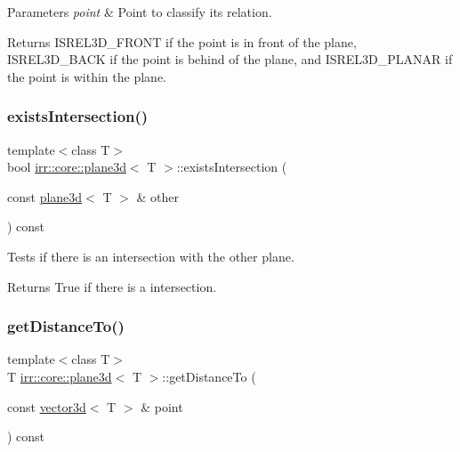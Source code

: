 \begin{DoxyParams}{Parameters}
{\em point} & Point to classify its relation. \\
\hline
\end{DoxyParams}
\begin{DoxyReturn}{Returns}
I\+S\+R\+E\+L3\+D\+\_\+\+F\+R\+O\+NT if the point is in front of the plane, I\+S\+R\+E\+L3\+D\+\_\+\+B\+A\+CK if the point is behind of the plane, and I\+S\+R\+E\+L3\+D\+\_\+\+P\+L\+A\+N\+AR if the point is within the plane. 
\end{DoxyReturn}
\mbox{\label{classirr_1_1core_1_1plane3d_a62f0838578d34260a5ef664718be59b4}} 
\subsubsection{\texorpdfstring{exists\+Intersection()}{existsIntersection()}}
{\footnotesize\ttfamily template$<$class T$>$ \\
bool \hyperlink{classirr_1_1core_1_1plane3d}{irr\+::core\+::plane3d}$<$ T $>$\+::exists\+Intersection (\begin{DoxyParamCaption}\item[{const \hyperlink{classirr_1_1core_1_1plane3d}{plane3d}$<$ T $>$ \&}]{other }\end{DoxyParamCaption}) const\hspace{0.3cm}{\ttfamily [inline]}}



Tests if there is an intersection with the other plane. 

\begin{DoxyReturn}{Returns}
True if there is a intersection. 
\end{DoxyReturn}
\mbox{\label{classirr_1_1core_1_1plane3d_ab5e41d5843bf3bb856f543186b8a7df8}} 
\subsubsection{\texorpdfstring{get\+Distance\+To()}{getDistanceTo()}}
{\footnotesize\ttfamily template$<$class T$>$ \\
T \hyperlink{classirr_1_1core_1_1plane3d}{irr\+::core\+::plane3d}$<$ T $>$\+::get\+Distance\+To (\begin{DoxyParamCaption}\item[{const \hyperlink{classirr_1_1core_1_1vector3d}{vector3d}$<$ T $>$ \&}]{point }\end{DoxyParamCaption}) const\hspace{0.3cm}{\ttfamily [inline]}}



